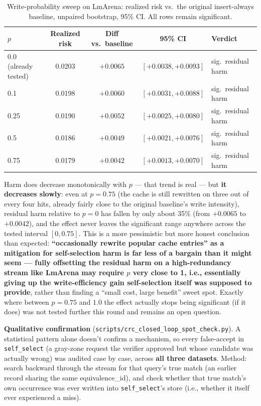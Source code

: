 \documentclass[11pt]{article}
\newenvironment{fittab}{\begin{lrbox}{\fittabbox}}{\end{lrbox}%
  \ifdim\wd\fittabbox>\linewidth\resizebox{\linewidth}{!}{\usebox{\fittabbox}}\else\usebox{\fittabbox}\fi}
\begin{document}
\begin{table}[h]
\centering
\small
\begin{fittab}\begin{tabular}{@{}lcccl@{}}
\toprule
\textbf{$p$} & \textbf{Realized risk} & \textbf{Diff vs.\ baseline} & \textbf{95\% CI} & \textbf{Verdict} \\
\midrule
0.0 (already tested) & 0.0203 & $+0.0065$ & $[+0.0038,+0.0093]$ & sig.\ residual harm \\
0.1 & 0.0198 & $+0.0060$ & $[+0.0031,+0.0088]$ & sig.\ residual harm \\
0.25 & 0.0190 & $+0.0052$ & $[+0.0025,+0.0080]$ & sig.\ residual harm \\
0.5 & 0.0186 & $+0.0049$ & $[+0.0021,+0.0076]$ & sig.\ residual harm \\
0.75 & 0.0179 & $+0.0042$ & $[+0.0013,+0.0070]$ & sig.\ residual harm \\
\bottomrule
\end{tabular}\end{fittab}
\caption{Write-probability sweep on LmArena: realized risk vs.\ the original insert-always baseline, unpaired bootstrap, 95\% CI. All rows remain significant.}
\end{table}

Harm does decrease monotonically with $p$ --- that trend is real --- but \textbf{it decreases slowly}: even at $p=0.75$ (the cache is still rewritten on three out of every four hits, already fairly close to the original baseline's write intensity), residual harm relative to $p=0$ has fallen by only about 35\% (from $+0.0065$ to $+0.0042$), and the effect never leaves the significant range anywhere across the tested interval $[0, 0.75]$. This is a more pessimistic but more honest conclusion than expected: \textbf{``occasionally rewrite popular cache entries'' as a mitigation for self-selection harm is far less of a bargain than it might seem --- fully offsetting the residual harm on a high-redundancy stream like LmArena may require $p$ very close to 1, i.e., essentially giving up the write-efficiency gain self-selection itself was supposed to provide}, rather than finding a ``small cost, large benefit'' sweet spot. Exactly where between $p=0.75$ and $1.0$ the effect actually stops being significant (if it does) was not tested further this round and remains an open question.

\textbf{Qualitative confirmation} (\texttt{scripts/\allowbreak{}crc\_\allowbreak{}closed\_\allowbreak{}loop\_\allowbreak{}spot\_\allowbreak{}check.\allowbreak{}py}). A statistical pattern alone doesn't confirm a mechanism, so every false-accept in \texttt{self\_\allowbreak{}select} (a gray-zone request the verifier approved but whose candidate was actually wrong) was audited case by case, across \textbf{all three datasets}. Method: search backward through the stream for that query's true match (an earlier record sharing the same equivalence\_id), and check whether that true match's own occurrence was ever written into \texttt{self\_\allowbreak{}select}'s store (i.e., whether it itself ever experienced a miss).
\end{document}
